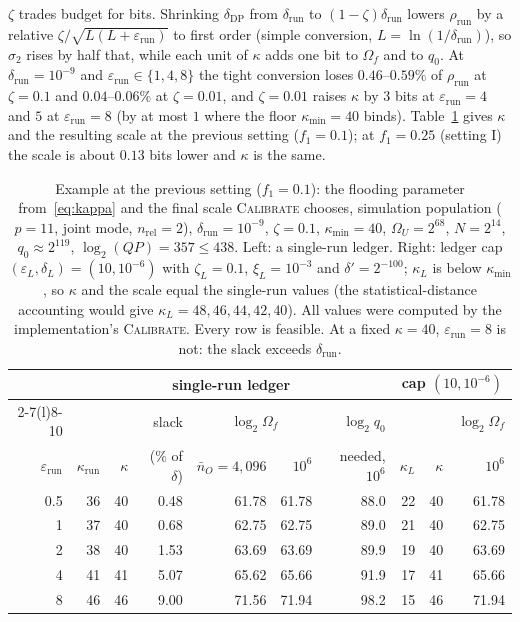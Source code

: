 \documentclass[11pt]{article}
\theoremstyle{definition}
\theoremstyle{plain}
\begin{document}
$\zeta$ trades budget for bits. Shrinking $\delta_{\mathrm{DP}}$ from $\delta_{\mathrm{run}}$ to $(1 - \zeta)\delta_{\mathrm{run}}$ lowers $\rho_{\mathrm{run}}$ by a relative $\zeta/\sqrt{L(L + \varepsilon_{\mathrm{run}})}$ to first order (simple conversion, $L = \ln(1/\delta_{\mathrm{run}})$), so $\sigma_2$ rises by half that, while each unit of $\kappa$ adds one bit to $\Omega_f$ and to $q_0$. At $\delta_{\mathrm{run}} = 10^{-9}$ and $\varepsilon_{\mathrm{run}} \in \{1, 4, 8\}$ the tight conversion loses $0.46$--$0.59\%$ of $\rho_{\mathrm{run}}$ at $\zeta = 0.1$ and $0.04$--$0.06\%$ at $\zeta = 0.01$, and $\zeta = 0.01$ raises $\kappa$ by $3$ bits at $\varepsilon_{\mathrm{run}} = 4$ and $5$ at $\varepsilon_{\mathrm{run}} = 8$ (by at most $1$ where the floor $\kappa_{\min} = 40$ binds). Table~\ref{tab:kappa} gives $\kappa$ and the resulting scale at the previous setting ($f_1 = 0.1$); at $f_1 = 0.25$ (setting I) the scale is about $0.13$ bits lower and $\kappa$ is the same.

\begin{table}[ht]
  \centering\small
  \caption{Example at the previous setting ($f_1 = 0.1$): the flooding parameter from~\eqref{eq:kappa} and the final scale \textsc{Calibrate} chooses, simulation population ($p = 11$, joint mode, $n_{\mathrm{rel}} = 2$), $\delta_{\mathrm{run}} = 10^{-9}$, $\zeta = 0.1$, $\kappa_{\min} = 40$, $\Omega_U = 2^{68}$, $N = 2^{14}$, $q_0 \approx 2^{119}$, $\log_2(QP) = 357 \le 438$. Left: a single-run ledger. Right: ledger cap $(\varepsilon_L, \delta_L) = (10, 10^{-6})$ with $\zeta_L = 0.1$, $\xi_L = 10^{-3}$ and $\delta' = 2^{-100}$; $\kappa_L$ is below $\kappa_{\min}$, so $\kappa$ and the scale equal the single-run values (the statistical-distance accounting would give $\kappa_L = 48, 46, 44, 42, 40$). All values were computed by the implementation's \textsc{Calibrate}. Every row is feasible. At a fixed $\kappa = 40$, $\varepsilon_{\mathrm{run}} = 8$ is not: the slack exceeds $\delta_{\mathrm{run}}$.}
  \label{tab:kappa}
  \begin{tabular}{@{}rrrrrrrrrr@{}}
    \toprule
    & \multicolumn{6}{c}{single-run ledger} & \multicolumn{3}{c}{cap $(10, 10^{-6})$} \\
    \cmidrule(lr){2-7}\cmidrule(l){8-10}
    & & & slack & \multicolumn{2}{c}{$\log_2\Omega_f$} & $\log_2 q_0$ & & & $\log_2\Omega_f$ \\
    $\varepsilon_{\mathrm{run}}$ & $\kappa_{\mathrm{run}}$ & $\kappa$ & ($\%$ of $\delta$) & $\bar n_O = 4{,}096$ & $10^6$ & needed, $10^6$ & $\kappa_L$ & $\kappa$ & $10^6$ \\
    \midrule
    0.5 & 36 & 40 & 0.48 & 61.78 & 61.78 & 88.0 & 22 & 40 & 61.78 \\
    1 & 37 & 40 & 0.68 & 62.75 & 62.75 & 89.0 & 21 & 40 & 62.75 \\
    2 & 38 & 40 & 1.53 & 63.69 & 63.69 & 89.9 & 19 & 40 & 63.69 \\
    4 & 41 & 41 & 5.07 & 65.62 & 65.66 & 91.9 & 17 & 41 & 65.66 \\
    8 & 46 & 46 & 9.00 & 71.56 & 71.94 & 98.2 & 15 & 46 & 71.94 \\
    \bottomrule
  \end{tabular}
\end{table}
\end{document}
